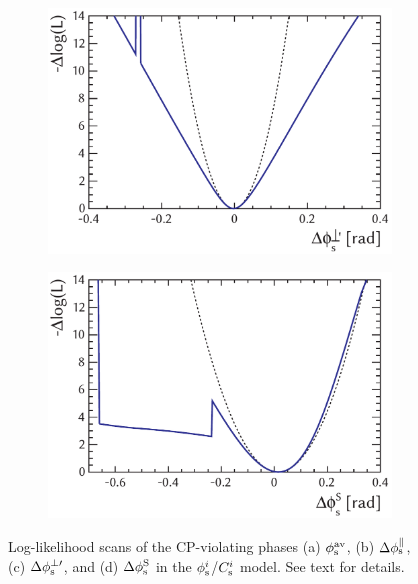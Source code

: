 \begin{figure}[tb]
  \vspace*{0.02\textwidth}
  \begin{subfigure}{0.49\textwidth}
    \includegraphics[width=\textwidth]{graphics/results/NLL_polarDep_phiCPRel_AperpApar}
    \caption{}
    \label{fig:NLL_CPV_phases_phiCPRel_AperpApar}
  \end{subfigure}
  \hfill%
  \begin{subfigure}{0.49\textwidth}
    \includegraphics[width=\textwidth]{graphics/results/NLL_polarDep_phiCPRel_AS}
    \caption{}
  \end{subfigure}

  \caption{Log-likelihood scans of the CP-violating phases (a) $\phi_\text{s}^{\text{av}}$, (b) $\Delta\phi_\text{s}^{\parallel}$, (c) $\Delta\phi_\text{s}^{\perp\prime}$, and (d) $\Delta\phi_\text{s}^{\text{S}}$
           in the $\phi_\text{s}^{i}$/$C_\text{s}^{i}$ model. See text for details.}
  \label{fig:NLL_CPV_phases}
\end{figure}

